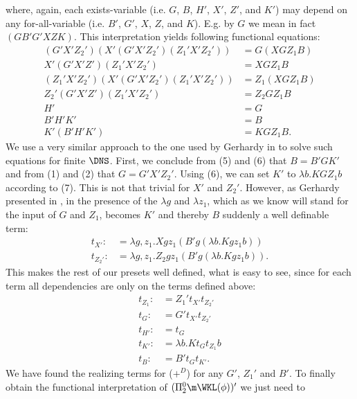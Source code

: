 where, again, each exists-variable (i.e. $G$, $B$, $H'$, $X'$, $Z'$, and $K'$) 
may depend on any 
for-all-variable (i.e. $B'$, $G'$, $X$, $Z$, and $K$). E.g. by $G$ we mean in 
fact $(GB'G'XZK)$.  This interpretation
yields following functional equations:
\setcounter{equation}{0}
\begin{align}
     (G'X'Z_2')(X'(G'X'Z_2')(Z_1'X'Z_2'))&=G(XGZ_1B)\\         %
     X'(G'X'Z')(Z_1'X'Z_2')&=XGZ_1B  \\                        %
     (Z_1'X'Z_2')(X'(G'X'Z_2')(Z_1'X'Z_2'))&=Z_1(XGZ_1B) \\    %
     Z_2'(G'X'Z')(Z_1'X'Z_2')&=Z_2GZ_1B \\                     %
     H'&=G \\                                                  %
     B'H'K'&=B\\                                               %
     K'(B'H'K')&=KGZ_1B                                        %
\text{.}
\end{align}
We use a very similar approach to the one used by Gerhardy in \cite{GerhardyX} to
solve such equations for finite $\DNS$. First, we conclude from (5) and (6)
that $B=B'GK'$ and from (1) and (2) that $G=G'X'Z_2'$. Using (6), we can set 
$K'$ to $\lambda b.KGZ_1b$ according to (7). This is not that trivial
for $X'$ and $Z_2'$. However, as Gerhardy presented in \cite{GerhardyX}, in the presence
of the $\lambda g$ and $\lambda z_1$, which as we know will stand for the input 
of $G$ and $Z_1$, becomes
$K'$ and thereby $B$ suddenly a well definable term:
\begin{align*} 
t_{X'}:&=\lambda g,z_1.Xgz_1(B'g(\lambda b.Kgz_1b))\\
t_{Z_2'}:&=\lambda g,z_1.Z_2gz_1(B'g(\lambda b.Kgz_1b))\text{.}
\end{align*} 
This makes the rest of our presets well defined, what is easy
to see, since for each term all dependencies are only on
the terms defined above:
\begin{align*} 
t_{Z_1}:&=Z_1't_{X'}t_{Z_2'}\\
t_{G}:&=G't_{X'}t_{Z_2'}\\
t_{H'}:&=t_{G}\\
t_{K'}:&=\lambda b.Kt_{G}t_{Z_1}b\\
t_{B}:&=B't_{G}t_{K'}\text{.}
\end{align*} 
We have found the realizing terms for ($+^D$) for any $G'$, $Z_1'$ and $B'$. To finally obtain
the functional interpretation of $(\Pi^0_2\m\WKL(\phi))'$ we just need to 
